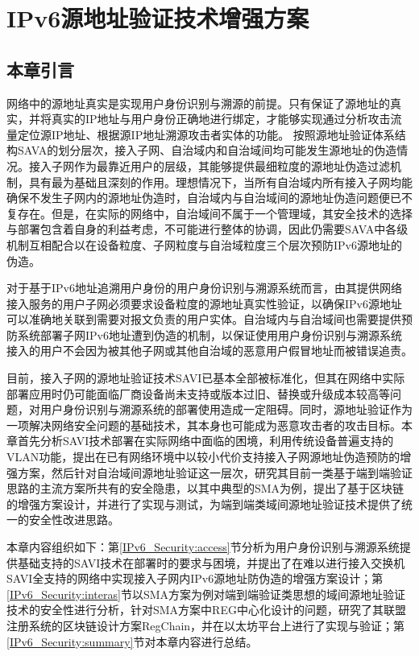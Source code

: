
\chapter{IPv6源地址验证技术增强方案}
\label{IPv6_Security}

  \section{本章引言}
  \label{IPv6_Security:introduction}
  网络中的源地址真实是实现用户身份识别与溯源的前提。只有保证了源地址的真实，并将真实的IP地址与用户身份正确地进行绑定，才能够实现通过分析攻击流量定位源IP地址、根据源IP地址溯源攻击者实体的功能。
  按照源地址验证体系结构SAVA的划分层次，接入子网、自治域内和自治域间均可能发生源地址的伪造情况。接入子网作为最靠近用户的层级，其能够提供最细粒度的源地址伪造过滤机制，具有最为基础且深刻的作用。理想情况下，当所有自治域内所有接入子网均能确保不发生子网内的源地址伪造时，自治域内与自治域间的源地址伪造问题便已不复存在。但是，在实际的网络中，自治域间不属于一个管理域，其安全技术的选择与部署包含着自身的利益考虑，不可能进行整体的协调，因此仍需要SAVA中各级机制互相配合以在设备粒度、子网粒度与自治域粒度三个层次预防IPv6源地址的伪造。

  对于基于IPv6地址追溯用户身份的用户身份识别与溯源系统而言，由其提供网络接入服务的用户子网必须要求设备粒度的源地址真实性验证，以确保IPv6源地址可以准确地关联到需要对报文负责的用户实体。自治域内与自治域间也需要提供预防系统部署子网IPv6地址遭到伪造的机制，以保证使用用户身份识别与溯源系统接入的用户不会因为被其他子网或其他自治域的恶意用户假冒地址而被错误追责。

  目前，接入子网的源地址验证技术SAVI已基本全部被标准化，但其在网络中实际部署应用时仍可能面临厂商设备尚未支持或版本过旧、替换或升级成本较高等问题，对用户身份识别与溯源系统的部署使用造成一定阻碍。同时，源地址验证作为一项解决网络安全问题的基础技术，其本身也可能成为恶意攻击者的攻击目标。本章首先分析SAVI技术部署在实际网络中面临的困境，利用传统设备普遍支持的VLAN功能，提出在已有网络环境中以较小代价支持接入子网源地址伪造预防的增强方案，然后针对自治域间源地址验证这一层次，研究其目前一类基于端到端验证思路的主流方案所共有的安全隐患，以其中典型的SMA为例，提出了基于区块链的增强方案设计，并进行了实现与测试，为端到端类域间源地址验证技术提供了统一的安全性改进思路。

  本章内容组织如下：第\ref{IPv6_Security:access}节分析为用户身份识别与溯源系统提供基础支持的SAVI技术在部署时的要求与困境，并提出了在难以进行接入交换机SAVI全支持的网络中实现接入子网内IPv6源地址防伪造的增强方案设计；第\ref{IPv6_Security:interas}节以SMA方案为例对端到端验证类思想的域间源地址验证技术的安全性进行分析，针对SMA方案中REG中心化设计的问题，研究了其联盟注册系统的区块链设计方案RegChain，并在以太坊平台上进行了实现与验证；第\ref{IPv6_Security:summary}节对本章内容进行总结。

